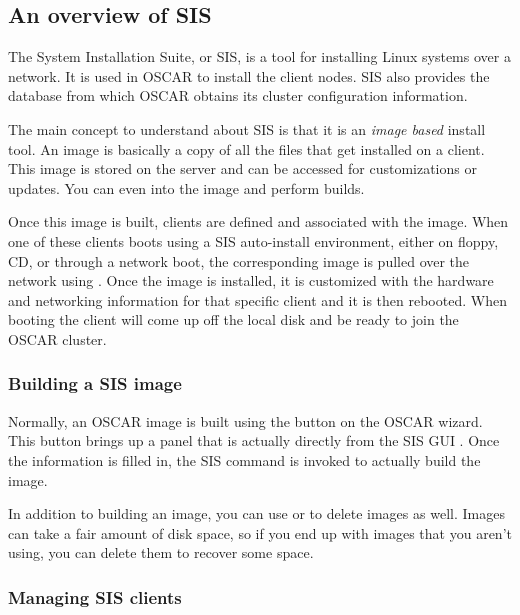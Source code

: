 %
%
%

\subsection{An overview of SIS}
\label{app:sis-overview}

The System Installation Suite, or SIS, is a tool for installing 
Linux systems over a network. It is used in OSCAR to install the
client nodes. SIS also provides the database from which OSCAR
obtains its cluster configuration information.

The main concept to understand about SIS is that it is an
\emph{image based} install tool. An image is basically a copy
of all the files that get installed on a client. This image
is stored on the server and can be accessed for customizations or
updates. You can even  into the image and perform builds.

Once this image is built, clients are defined and associated with the
image. When one of these clients boots using a SIS auto-install
environment, either on floppy, CD, or through a network boot, the
corresponding image is pulled over the network using . 
Once the image is installed, it is customized with the hardware and
networking information for that specific client and it is then rebooted.
When booting the client will come up off the local disk and be ready
to join the OSCAR cluster.

\subsubsection{Building a SIS image}

Normally, an OSCAR image is built using the  
button on the OSCAR wizard. This button brings up a panel that is actually 
directly from the SIS GUI . Once the information is filled in,
the SIS command  is invoked to actually build the image. 

In addition to building an image, you can use  or 
to delete images as well. Images can take a fair amount of disk space, so if
you end up with images that you aren't using, you can delete them to recover 
some space.

\subsubsection{Managing SIS clients}

